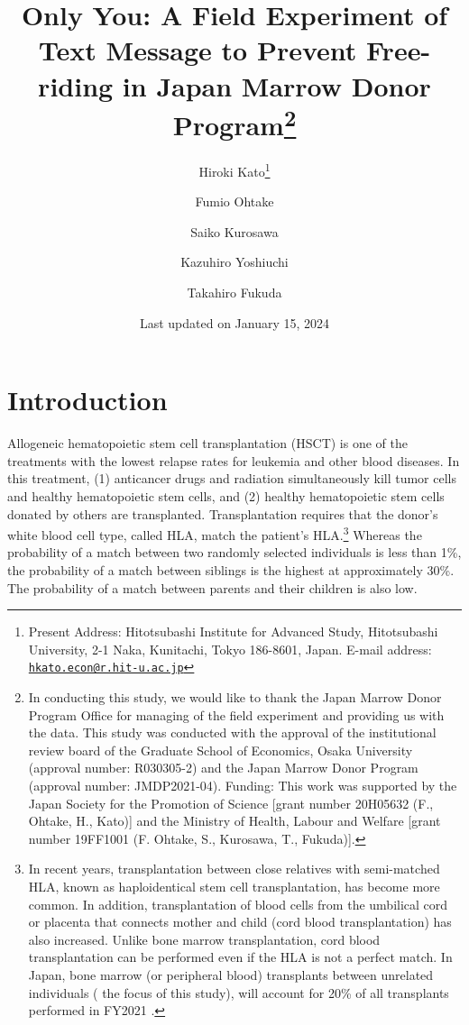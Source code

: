 \documentclass[12pt, a4paper]{article}
\title{Only You:
A Field Experiment of Text Message to Prevent Free-riding in Japan Marrow Donor Program\thanks{In conducting this study, we would like to thank the Japan Marrow Donor Program Office for managing of the field experiment and providing us with the data. This study was conducted with the approval of the institutional review board of the Graduate School of Economics, Osaka University (approval number: R030305-2) and the Japan Marrow Donor Program (approval number: JMDP2021-04). Funding: This work was supported by the Japan Society for the Promotion of Science {[}grant number 20H05632 (F., Ohtake, H., Kato){]} and the Ministry of Health, Labour and Welfare {[}grant number 19FF1001 (F. Ohtake, S., Kurosawa, T., Fukuda){]}.}}
\author[a]{%
  Hiroki Kato\thanks{Present Address: Hitotsubashi Institute for Advanced Study, Hitotsubashi University, 2-1 Naka, Kunitachi, Tokyo 186-8601, Japan. E-mail address: \href{mailto:hkato.econ@r.hit-u.ac.jp}{\nolinkurl{hkato.econ@r.hit-u.ac.jp}}}
}
\author[b]{%
  Fumio Ohtake
}
\author[c]{%
  Saiko Kurosawa
}
\author[d]{%
  Kazuhiro Yoshiuchi
}
\author[e]{%
  Takahiro Fukuda
}
\affil[a]{Graduate School of Economics, Osaka University}
\affil[b]{Center for Infectious Disease Education and Research (CiDER), Osaka University}
\affil[c]{Department of Oncology, Ina Central Hospital}
\affil[d]{Graduate School of Medicine, Tokyo University}
\affil[e]{Department of Hematopoietic Stem Cell Transplantation, National Cancer Center Hospital}
\date{Last updated on January 15, 2024}
\begin{document}



\hypertarget{intro}{%
\section{Introduction}\label{intro}}

Allogeneic hematopoietic stem cell transplantation (HSCT) is one of the treatments with the lowest relapse rates for leukemia and other blood diseases. In this treatment, (1) anticancer drugs and radiation simultaneously kill tumor cells and healthy hematopoietic stem cells, and (2) healthy hematopoietic stem cells donated by others are transplanted. Transplantation requires that the donor's white blood cell type, called HLA, match the patient's HLA.\footnote{In recent years, transplantation between close relatives with semi-matched HLA, known as haploidentical stem cell transplantation, has become more common. In addition, transplantation of blood cells from the umbilical cord or placenta that connects mother and child (cord blood transplantation) has also increased. Unlike bone marrow transplantation, cord blood transplantation can be performed even if the HLA is not a perfect match. In Japan, bone marrow (or peripheral blood) transplants between unrelated individuals ( the focus of this study), will account for 20\% of all transplants performed in FY2021 \citep{JapaneseDataCenterf2022}.} Whereas the probability of a match between two randomly selected individuals is less than 1\%, the probability of a match between siblings is the highest at approximately 30\%. The probability of a match between parents and their children is also low.
\end{document}
